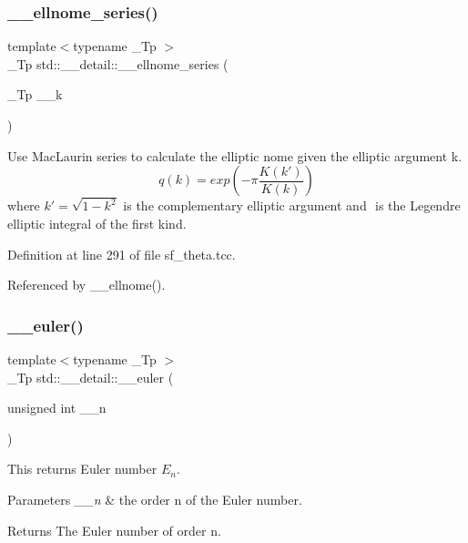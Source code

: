 \subsubsection{\texorpdfstring{\+\_\+\+\_\+ellnome\+\_\+series()}{\_\_ellnome\_series()}}
{\footnotesize\ttfamily template$<$typename \+\_\+\+Tp $>$ \\
\+\_\+\+Tp std\+::\+\_\+\+\_\+detail\+::\+\_\+\+\_\+ellnome\+\_\+series (\begin{DoxyParamCaption}\item[{\+\_\+\+Tp}]{\+\_\+\+\_\+k }\end{DoxyParamCaption})}

Use Mac\+Laurin series to calculate the elliptic nome given the elliptic argument k. \[ q(k) = exp\left(-\pi\frac{K(k')}{K(k)}\right) \] where $ k' = \sqrt{1 - k^2} $ is the complementary elliptic argument and $ $ is the Legendre elliptic integral of the first kind. 

Definition at line 291 of file sf\+\_\+theta.\+tcc.



Referenced by \+\_\+\+\_\+ellnome().

\mbox{\label{namespacestd_1_1____detail_a38f2ed4541c9876b8549c3917aad3b08}} 
\subsubsection{\texorpdfstring{\+\_\+\+\_\+euler()}{\_\_euler()}\hspace{0.1cm}{\footnotesize\ttfamily [1/2]}}
{\footnotesize\ttfamily template$<$typename \+\_\+\+Tp $>$ \\
\+\_\+\+Tp std\+::\+\_\+\+\_\+detail\+::\+\_\+\+\_\+euler (\begin{DoxyParamCaption}\item[{unsigned int}]{\+\_\+\+\_\+n }\end{DoxyParamCaption})\hspace{0.3cm}{\ttfamily [inline]}}



This returns Euler number $ E_n $. 


\begin{DoxyParams}{Parameters}
{\em \+\_\+\+\_\+n} & the order n of the Euler number. \\
\hline
\end{DoxyParams}
\begin{DoxyReturn}{Returns}
The Euler number of order n. 
\end{DoxyReturn}


